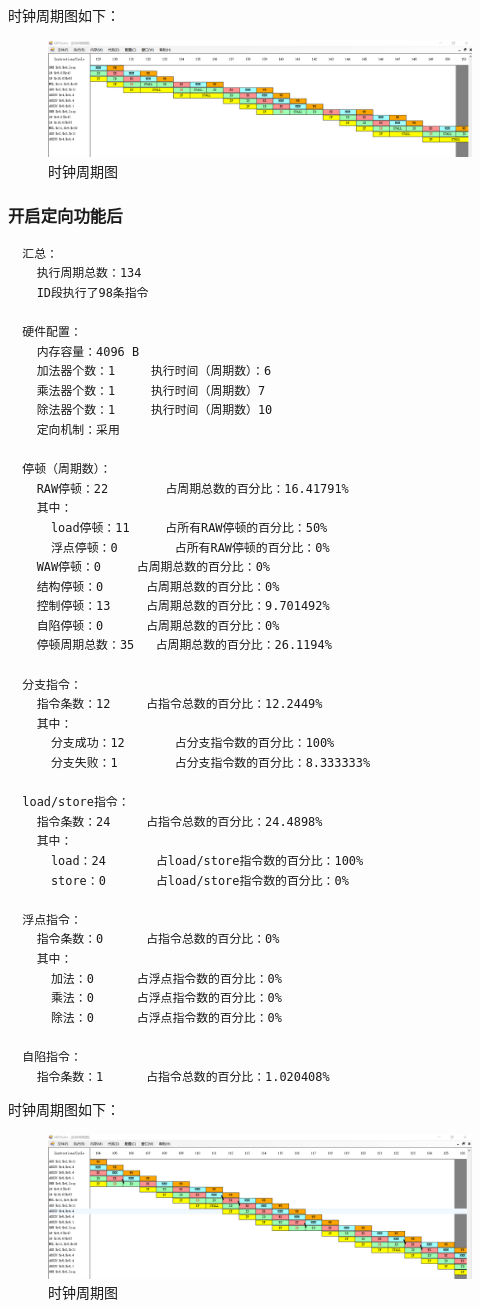 \documentclass[blue,normal,cn]{elegantnote}
\begin{document}
时钟周期图如下：

\begin{figure}[H]
    \centering
    \includegraphics[width=.8\textwidth]{fig/naive_prod.png}
    \caption{时钟周期图}
    \label{fig:naive_prod}
\end{figure}

\subsubsection{开启定向功能后}

\begin{lstlisting}
  汇总：
    执行周期总数：134
    ID段执行了98条指令

  硬件配置：
    内存容量：4096 B
    加法器个数：1		执行时间（周期数）：6
    乘法器个数：1		执行时间（周期数）7		
    除法器个数：1		执行时间（周期数）10		
    定向机制：采用

  停顿（周期数）：
    RAW停顿：22		占周期总数的百分比：16.41791%
    其中：
      load停顿：11		占所有RAW停顿的百分比：50%
      浮点停顿：0		占所有RAW停顿的百分比：0%
    WAW停顿：0		占周期总数的百分比：0%
    结构停顿：0		占周期总数的百分比：0%
    控制停顿：13		占周期总数的百分比：9.701492%
    自陷停顿：0		占周期总数的百分比：0%
    停顿周期总数：35	占周期总数的百分比：26.1194%

  分支指令：
    指令条数：12		占指令总数的百分比：12.2449%
    其中：
      分支成功：12		占分支指令数的百分比：100%
      分支失败：1		占分支指令数的百分比：8.333333%

  load/store指令：
    指令条数：24		占指令总数的百分比：24.4898%
    其中：
      load：24		占load/store指令数的百分比：100%
      store：0		占load/store指令数的百分比：0%

  浮点指令：
    指令条数：0		占指令总数的百分比：0%
    其中：
      加法：0		占浮点指令数的百分比：0%
      乘法：0		占浮点指令数的百分比：0%
      除法：0		占浮点指令数的百分比：0%

  自陷指令：
    指令条数：1		占指令总数的百分比：1.020408%
\end{lstlisting}

时钟周期图如下：

\begin{figure}[H]
    \centering
    \includegraphics[width=.8\textwidth]{fig/naive_prod_bypass.png}
    \caption{时钟周期图}
    \label{fig:naive_prod_bypass}
\end{figure}
\end{document}
